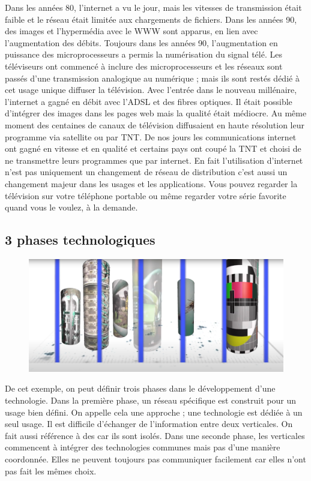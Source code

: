 Dans les années 80, l'internet a vu le jour, mais les vitesses de transmission était faible et le réseau était limitée aux chargements de fichiers. Dans les années 90, des images et l'hypermédia avec le \ac{WWW} sont apparus, en lien avec l'augmentation des débits. Toujours dans les années 90, l'augmentation en puissance des microprocesseurs a permis la numérisation du signal télé. Les téléviseurs ont commencé à inclure des microprocesseurs et les réseaux sont passés d'une transmission analogique au numérique ; mais ils sont restés dédié à cet usage unique diffuser la télévision. Avec l'entrée dans le nouveau millénaire, l'internet a gagné en débit avec l'\ac{ADSL} et des fibres optiques. Il était possible d'intégrer des images dans les pages web mais la qualité était médiocre. Au même moment des centaines de canaux de télévision diffusaient en haute résolution leur programme via satellite ou par \ac{TNT}. De nos jours les communications internet ont gagné en vitesse et en qualité et certains pays ont coupé la \ac{TNT} et choisi de ne transmettre leurs programmes que par internet. En fait l'utilisation d'internet n'est pas uniquement un changement de réseau de distribution c'est aussi un changement majeur dans les usages et les applications. Vous pouvez regarder la télévision sur votre téléphone portable ou même regarder votre série favorite quand vous le voulez, à la demande. 

  \vspace{2em}

\subsection{3 phases technologiques}
   \vspace{1em}

\begin{figure}
\centerline{\includegraphics[width=.4\columnwidth]{Pictures/illu-verticals.png}}
\end{figure}
De cet exemple, on peut définir trois phases dans le développement d'une technologie. Dans la première phase, un réseau spécifique est construit pour un usage bien défini. On appelle cela une approche  ; une technologie est dédiée à un seul usage. Il est difficile d'échanger de l'information entre deux verticales. On fait aussi référence à des  car ils sont isolés. Dans une seconde phase, les verticales commencent à intégrer des technologies communes mais pas d'une manière coordonnée. Elles ne peuvent toujours pas communiquer facilement car elles n'ont pas fait les mêmes choix.


